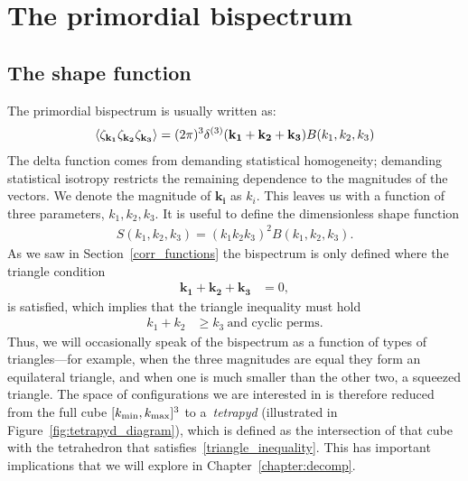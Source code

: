 \section{The primordial bispectrum}
    \subsection{The shape function}
The primordial bispectrum is usually written as:
\begin{align}\label{bispectrum_definition}
{
\left< \zeta_{\bf{k_1}}\zeta_{\bf{k_2}}\zeta_{\bf{k_3}} \right>
= (2\pi)^3\delta^{(3)}(\mathbf{k_1}+\mathbf{k_2}+\mathbf{k_3})B(k_1,k_2,k_3)
}
\end{align}
The delta function comes from demanding statistical homogeneity;
demanding statistical isotropy restricts the remaining dependence to the magnitudes of the vectors.
We denote the magnitude of $\mathbf{k_i}$ as $k_i$.
This leaves us with a function of three parameters,
$k_1,k_2,k_3$.
It is useful to define the dimensionless shape function
\begin{align}\label{shapefn}
    S(k_1,k_2,k_3) = (k_1k_2k_3)^2B(k_1,k_2,k_3).
\end{align}
As we saw in Section~\ref{corr_functions}
the bispectrum is only defined where the triangle condition
\begin{align}\label{triangle_condition}
    \mathbf{k_1}+\mathbf{k_2}+\mathbf{k_3} &= 0,
\end{align}
is satisfied, which implies that the triangle inequality must hold
\begin{align}\label{triangle_inequality}
    k_1+k_2 &\geq k_3~\text{and cyclic perms}.
\end{align}
Thus, we will occasionally speak of the bispectrum as a function of types
of triangles---for example, when the three magnitudes are
equal they form an equilateral triangle, and when one is much smaller than
the other two, a squeezed triangle.
The space of configurations we are interested in is therefore
reduced from the full cube $[{k_\text{min}},{k_\text{max}}]^3$
to a~\textit{tetrapyd} (illustrated in Figure~\ref{fig:tetrapyd_diagram}),
which is defined as the intersection of that cube with the
tetrahedron that satisfies~\eqref{triangle_inequality}.
This has important implications that we will explore in
Chapter~\ref{chapter:decomp}. 
